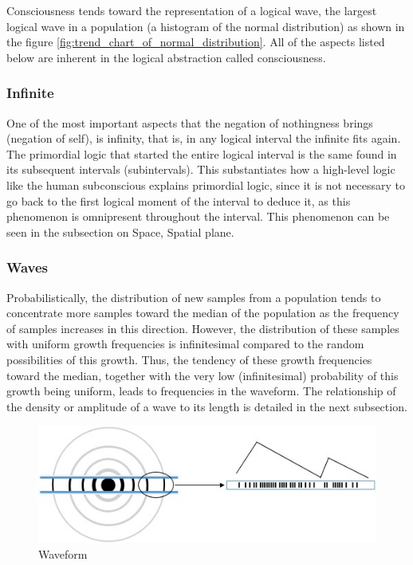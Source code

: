 Consciousness tends toward the representation of a logical wave, the largest logical wave in a population (a histogram of the normal distribution) as shown in the figure \ref{fig:trend_chart_of_normal_distribution}. All of the aspects listed below are inherent in the logical abstraction called consciousness.

\subsubsection{Infinite}
One of the most important aspects that the negation of nothingness brings (negation of self), is infinity, that is, in any logical interval the infinite fits again. The primordial logic that started the entire logical interval is the same found in its subsequent intervals (subintervals). This substantiates how a high-level logic like the human subconscious explains primordial logic, since it is not necessary to go back to the first logical moment of the interval to deduce it, as this phenomenon is omnipresent throughout the interval. This phenomenon can be seen in the subsection on Space, Spatial plane.

\subsubsection{Waves}
Probabilistically, the distribution of new samples from a population tends to concentrate more samples toward the median of the population as the frequency of samples increases in this direction. However, the distribution of these samples with uniform growth frequencies is infinitesimal compared to the random possibilities of this growth. Thus, the tendency of these growth frequencies toward the median, together with the very low (infinitesimal) probability of this growth being uniform, leads to frequencies in the waveform. The relationship of the density or amplitude of a wave to its length is detailed in the next subsection.
	\begin{figure}[H]
	\caption{Waveform}
	\label{fig:consciousness_waves}
	\centering
	\includegraphics[scale=.8]{sections/images/consciousness_waves.jpg}
	\end{figure}

